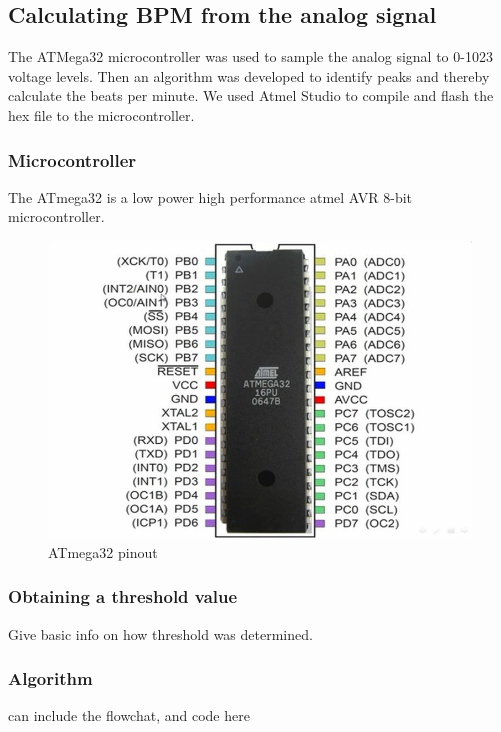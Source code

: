 \documentclass[12pt]{article}
\begin{document}
		\clearpage
	\subsection{Calculating BPM from the analog signal}
	The ATMega32 microcontroller was used to sample the analog signal to 0-1023 voltage levels. Then an algorithm was developed to identify peaks and thereby calculate the beats per minute. We used Atmel Studio to compile and flash the hex file to the microcontroller. 


	\subsubsection{Microcontroller}
	The ATmega32 is a low power high performance atmel AVR 8-bit microcontroller.
			\begin{figure}[!htbp]
				\centering
				\includegraphics[scale = 1]{atmega32.jpg}
				\caption{ATmega32 pinout}
			\end{figure}

	\subsubsection{Obtaining a threshold value}
	Give basic info on how threshold was determined.

	\subsubsection{Algorithm}
	can include the flowchat, and code here
\end{document}
